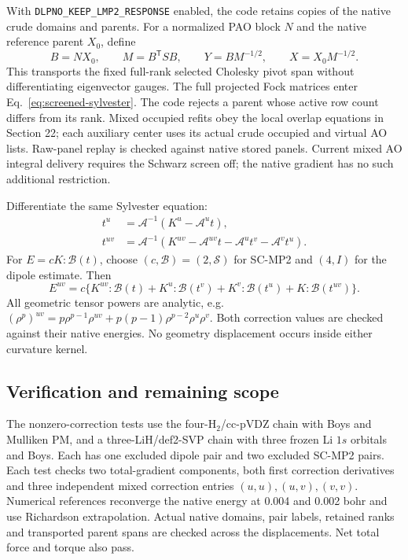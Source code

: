 \documentclass[11pt]{article}
\begin{document}
With \texttt{DLPNO\_KEEP\_LMP2\_RESPONSE} enabled, the code retains
copies of the native crude domains and parents. For a normalized PAO block
$N$ and the native reference parent $X_0$, define
\begin{equation}
 B=N X_0,\qquad M=B^{\mathsf T}SB,\qquad
 Y=B M^{-1/2},\qquad X=X_0M^{-1/2}.
\end{equation}
This transports the fixed full-rank selected Cholesky pivot span without
differentiating eigenvector gauges. The full projected Fock matrices enter
Eq.~\eqref{eq:screened-sylvester}. The code rejects a parent whose active
row count differs from its rank. Mixed occupied refits obey the local
overlap equations in Section 22; each auxiliary center uses its actual
crude occupied and virtual AO lists. Raw-panel replay is checked against
native stored panels. Current mixed AO integral delivery requires the
Schwarz screen off; the native gradient has no such additional restriction.

Differentiate the same Sylvester equation:
\begin{align}
 t^u&=\mathcal A^{-1}(K^u-\mathcal A^u t),\\
 t^{uv}&=\mathcal A^{-1}
 (K^{uv}-\mathcal A^{uv}t-\mathcal A^u t^v-\mathcal A^v t^u).
\end{align}
For $E=cK:\mathcal B(t)$, choose $(c,\mathcal B)=(2,\mathcal S)$ for
SC-MP2 and $(4,I)$ for the dipole estimate. Then
\begin{equation}
 E^{uv}=c\{K^{uv}:\mathcal B(t)+K^u:\mathcal B(t^v)
              +K^v:\mathcal B(t^u)+K:\mathcal B(t^{uv})\}.
\end{equation}
All geometric tensor powers are analytic, e.g.
$(\rho^p)^{uv}=p\rho^{p-1}\rho^{uv}
+p(p-1)\rho^{p-2}\rho^u\rho^v$.
Both correction values are checked against their native energies.
No geometry displacement occurs inside either curvature kernel.

\subsection{Verification and remaining scope}
The nonzero-correction tests use the four-H$_2$/cc-pVDZ chain with Boys
and Mulliken PM, and a three-LiH/def2-SVP chain with three frozen Li $1s$
orbitals and Boys. Each has one excluded dipole pair and two excluded
SC-MP2 pairs. Each test checks two total-gradient components, both first
correction derivatives and three independent mixed correction entries
$(u,u),(u,v),(v,v)$. Numerical references reconverge the native energy at
0.004 and 0.002 bohr and use Richardson extrapolation. Actual native
domains, pair labels, retained ranks and transported parent spans are
checked across the displacements. Net total force and torque also pass.
\end{document}
